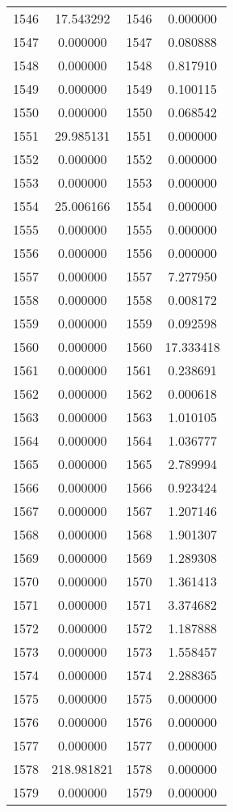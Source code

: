 \documentclass[12pt]{article}
\begin{document}
\begin{longtable}{@{}cccc@{}}
1546 & 17.543292 & 1546 & 0.000000 \\
1547 & 0.000000 & 1547 & 0.080888 \\
1548 & 0.000000 & 1548 & 0.817910 \\
1549 & 0.000000 & 1549 & 0.100115 \\
1550 & 0.000000 & 1550 & 0.068542 \\
1551 & 29.985131 & 1551 & 0.000000 \\
1552 & 0.000000 & 1552 & 0.000000 \\
1553 & 0.000000 & 1553 & 0.000000 \\
1554 & 25.006166 & 1554 & 0.000000 \\
1555 & 0.000000 & 1555 & 0.000000 \\
1556 & 0.000000 & 1556 & 0.000000 \\
1557 & 0.000000 & 1557 & 7.277950 \\
1558 & 0.000000 & 1558 & 0.008172 \\
1559 & 0.000000 & 1559 & 0.092598 \\
1560 & 0.000000 & 1560 & 17.333418 \\
1561 & 0.000000 & 1561 & 0.238691 \\
1562 & 0.000000 & 1562 & 0.000618 \\
1563 & 0.000000 & 1563 & 1.010105 \\
1564 & 0.000000 & 1564 & 1.036777 \\
1565 & 0.000000 & 1565 & 2.789994 \\
1566 & 0.000000 & 1566 & 0.923424 \\
1567 & 0.000000 & 1567 & 1.207146 \\
1568 & 0.000000 & 1568 & 1.901307 \\
1569 & 0.000000 & 1569 & 1.289308 \\
1570 & 0.000000 & 1570 & 1.361413 \\
1571 & 0.000000 & 1571 & 3.374682 \\
1572 & 0.000000 & 1572 & 1.187888 \\
1573 & 0.000000 & 1573 & 1.558457 \\
1574 & 0.000000 & 1574 & 2.288365 \\
1575 & 0.000000 & 1575 & 0.000000 \\
1576 & 0.000000 & 1576 & 0.000000 \\
1577 & 0.000000 & 1577 & 0.000000 \\
1578 & 218.981821 & 1578 & 0.000000 \\
1579 & 0.000000 & 1579 & 0.000000 \\

\end{longtable}
\end{document}
